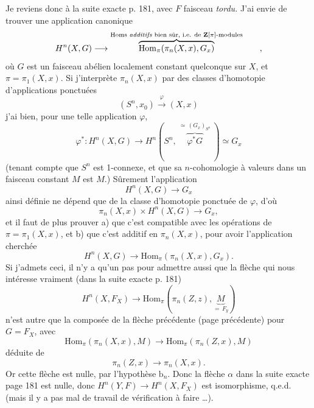 Je reviens donc à la suite exacte p. 181, avec $F$ faisceau \textit{tordu.} J’ai envie de trouver une application canonique
\[
H^n(X,G) \longrightarrow \overbrace{\mathrm{Hom}_\pi(\pi_n(X,x),G_x)}^{\text{\scriptsize Homs \textit{additifs} bien sûr, i.e. de $\mathbf{Z}[\pi]$-modules}} \qquad ,
\]
où $G$ est un faisceau abélien localement constant quelconque sur $X$, et $\pi = \pi_1(X,x)$. Si j’interprète
$\pi_n(X,x)$ par des classes d’homotopie d’applications ponctuées
\[
(S^n,x_0) \xrightarrow{\ \varphi\ } (X,x)
\]
j’ai bien, pour une telle application $\varphi$,
\[
\varphi^* : H^n(X,G) \longrightarrow H^n(S^n,\ \overbrace{\varphi^*G}^{\simeq\,(G_x)_{S^n}}\ ) \simeq G_x
\]
(tenant compte que $S^n$ est 1-connexe, et que sa $n$-cohomologie à valeurs dans un faisceau constant $M$ est $M$.) Sûrement l’application
\[
H^n(X,G) \longrightarrow G_x
\]
ainsi définie ne dépend que de la classe d’homotopie ponctuée de $\varphi$, d’où
\[
\pi_n(X,x) \times H^n(X,G) \longrightarrow G_x,
\]
et il faut de plus prouver a) que c’est compatible avec les opérations de $\pi = \pi_1(X,x)$, et b) que c’est additif en $\pi_n(X,x)$, pour avoir l’application cherchée
\[
H^n(X,G) \longrightarrow \mathrm{Hom}_\pi(\pi_n(X,x),G_x).
\]
Si j’admets ceci, il n’y a qu’un pas pour admettre aussi que la flèche qui nous intéresse vraiment (dans la suite exacte p. 181)
\[
H^n(X,F_X) \longrightarrow \mathrm{Hom}_\pi(\pi_n(Z,z),\underbrace{M}_{=\,F_y})
\]
n’est autre que la composée de la flèche précédente (page précédente) pour $G = F_X$, avec
\[
\mathrm{Hom}_\pi(\pi_n(X,x),M) \longrightarrow \mathrm{Hom}_\pi(\pi_n(Z,x),M)
\]
déduite de
\[
\pi_n(Z,x) \longrightarrow \pi_n(X,x).
\]
Or cette flèche est nulle, par l’hypothèse $\mathrm{b}_n$. Donc la flèche $\alpha$ dans la suite exacte page 181 est nulle, donc $H^n(Y,F) \longrightarrow H^n(X,F_X)$ est isomorphisme, q.e.d. (mais il y a pas mal de travail de vérification à faire \dots).

